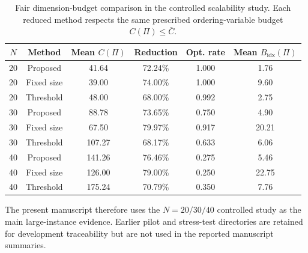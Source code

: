 \begin{table}[H]
  \centering
  \caption{Fair dimension-budget comparison in the controlled scalability study. Each reduced method respects the same prescribed ordering-variable budget \(C(\Pi)\le \bar C\).}
  \label{tab:fair-comparison}
  \begin{tabular}{cccccc}
    \toprule
    \(N\) & Method & Mean \(C(\Pi)\) & Reduction & Opt. rate & Mean \(B_{\mathrm{idx}}(\Pi)\) \\
    \midrule
    20 & Proposed & 41.64 & 72.24\% & 1.000 & 1.76 \\
    20 & Fixed size & 39.00 & 74.00\% & 1.000 & 9.60 \\
    20 & Threshold & 48.00 & 68.00\% & 0.992 & 2.75 \\
    30 & Proposed & 88.78 & 73.65\% & 0.750 & 4.90 \\
    30 & Fixed size & 67.50 & 79.97\% & 0.917 & 20.21 \\
    30 & Threshold & 107.27 & 68.17\% & 0.633 & 6.06 \\
    40 & Proposed & 141.26 & 76.46\% & 0.275 & 5.46 \\
    40 & Fixed size & 126.00 & 79.00\% & 0.250 & 22.75 \\
    40 & Threshold & 175.24 & 70.79\% & 0.350 & 7.76 \\
    \bottomrule
  \end{tabular}
\end{table}

The present manuscript therefore uses the \(N=20/30/40\) controlled study as the main large-instance evidence. Earlier pilot and stress-test directories are retained for development traceability but are not used in the reported manuscript summaries.
